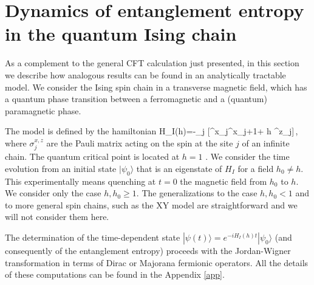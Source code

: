 \section{Dynamics of entanglement entropy in the quantum Ising chain}
\label{secIs}

As a complement to the general CFT calculation just presented, in this
section we describe how analogous results can be found in an analytically 
tractable model. We consider the Ising spin chain in a transverse 
magnetic field, which has a quantum phase transition between a ferromagnetic
and a (quantum) paramagnetic phase.

The model is defined by the hamiltonian
\be
H_I(h)=-\sum_j [\s^x_j\s^x_{j+1}+ h \s^z_j]\,,
\label{HI}
\ee
where $\sigma^{x,z}_j$ are the Pauli matrix acting on the spin at the site 
$j$ of an infinite chain. The quantum critical point is located 
at $h=1$ \cite{sach}. 
We consider the time evolution from an initial state $|\psi_0\rangle$ 
that is an eigenstate of $H_I$ for a field $h_0\neq h$. 
This experimentally means quenching at $t=0$ the magnetic field from $h_0$ 
to $h$. We consider only the case $h,h_0\geq 1$. 
The generalizations to the case $h,h_0<1$ and to more general spin chains, 
such as the XY model \cite{sach} are straightforward and we will not 
consider them here.

The determination of the time-dependent state 
$|\psi(t)\rangle=e^{-i H_I(h) t}|\psi_0\rangle$ (and consequently of the 
entanglement entropy) proceeds with the Jordan-Wigner transformation in terms
of Dirac or Majorana fermionic operators. 
All the details of these computations can be found in the Appendix \ref{app}.

